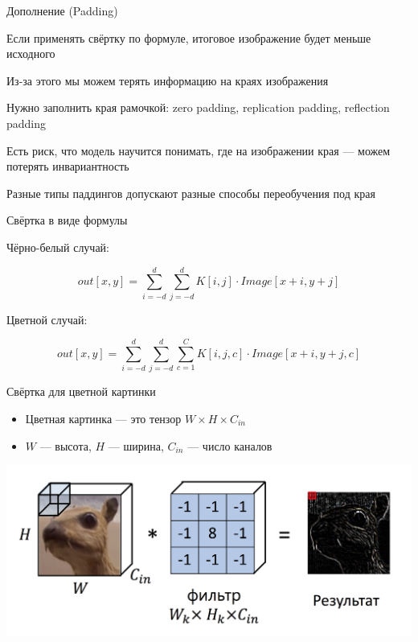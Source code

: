 \documentclass[notes,12pt, aspectratio=169]{beamer}
\newenvironment{wideitemize}{\itemize\addtolength{\itemsep}{10pt}}{\enditemize}
\begin{document}
\begin{frame}{Дополнение (Padding)}
\begin{wideitemize}
	\item Если применять свёртку по формуле, итоговое изображение будет меньше исходного
	\item Из-за этого мы можем терять информацию на краях изображения
	\item Нужно заполнить края рамочкой: zero padding, replication padding, reflection padding
	\item Есть риск, что модель научится понимать, где на изображении края — можем потерять инвариантность
	\item Разные типы паддингов допускают разные способы переобучения под края
\end{wideitemize}
\end{frame}


\begin{frame}{Свёртка в виде формулы}

Чёрно-белый случай:

\[
out[x, y] = \sum_{i = -d}^{d}  \sum_{j= -d}^{d}   K[i, j] \cdot Image[x + i, y + j]
\]

Цветной случай: 

\[
out[x, y] = \sum_{i = -d}^{d}  \sum_{j= -d}^{d}  \sum_{c= 1}^{C}  K[i, j, c] \cdot Image[x + i, y + j, c]
\]

\end{frame}


\begin{frame}{Свёртка для цветной картинки}
\begin{itemize} 
	\item  Цветная картинка — это тензор $W \times H \times C_{in}$
	\item $W$ — высота, $H$ — ширина, $C_{in}$ — число каналов 
\end{itemize}
\begin{center}
	\includegraphics[width=.6\linewidth]{cconv_4.png}
\end{center}
\end{frame}
\end{document}
